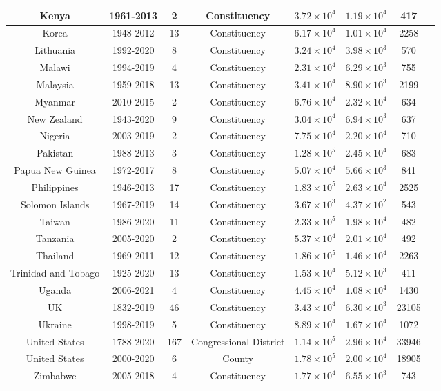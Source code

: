 \begin{table}[h]
\begin{tabular}{|c|c|c|c|c|c|c|c|}
Kenya & 1961-2013 & 2 & Constituency & $3.72\times 10^{4}$ & $1.19\times 10^{4}$ & 417\\ \hline
Korea & 1948-2012 & 13 & Constituency & $6.17\times 10^{4}$ & $1.01\times 10^{4}$ & 2258\\ \hline
Lithuania & 1992-2020 & 8 & Constituency & $3.24\times 10^{4}$ & $3.98\times 10^{3}$ & 570\\ \hline
Malawi & 1994-2019 & 4 & Constituency & $2.31\times 10^{4}$ & $6.29\times 10^{3}$ & 755\\ \hline
Malaysia & 1959-2018 & 13 & Constituency & $3.41\times 10^{4}$ & $8.90\times 10^{3}$ & 2199\\ \hline
Myanmar & 2010-2015 & 2 & Constituency & $6.76\times 10^{4}$ & $2.32\times 10^{4}$ & 634\\ \hline
New Zealand & 1943-2020 & 9 & Constituency & $3.04\times 10^{4}$ & $6.94\times 10^{3}$ & 637\\ \hline
Nigeria & 2003-2019 & 2 & Constituency & $7.75\times 10^{4}$ & $2.20\times 10^{4}$ & 710\\ \hline
Pakistan & 1988-2013 & 3 & Constituency & $1.28\times 10^{5}$ & $2.45\times 10^{4}$ & 683\\ \hline
Papua New Guinea & 1972-2017 & 8 & Constituency & $5.07\times 10^{4}$ & $5.66\times 10^{3}$ & 841\\ \hline
Philippines & 1946-2013 & 17 & Constituency & $1.83\times 10^{5}$ & $2.63\times 10^{4}$ & 2525\\ \hline
Solomon Islands & 1967-2019 & 14 & Constituency & $3.67\times 10^{3}$ & $4.37\times 10^{2}$ & 543\\ \hline
Taiwan & 1986-2020 & 11 & Constituency & $2.33\times 10^{5}$ & $1.98\times 10^{4}$ & 482\\ \hline
Tanzania & 2005-2020 & 2 & Constituency & $5.37\times 10^{4}$ & $2.01\times 10^{4}$ & 492\\ \hline
Thailand & 1969-2011 & 12 & Constituency & $1.86\times 10^{5}$ & $1.46\times 10^{4}$ & 2263\\ \hline
Trinidad and Tobago & 1925-2020 & 13 & Constituency & $1.53\times 10^{4}$ & $5.12\times 10^{3}$ & 411\\ \hline
Uganda & 2006-2021 & 4 & Constituency & $4.45\times 10^{4}$ & $1.08\times 10^{4}$ & 1430\\ \hline
UK & 1832-2019 & 46 & Constituency & $3.43\times 10^{4}$ & $6.30\times 10^{3}$ & 23105\\ \hline
Ukraine & 1998-2019 & 5 & Constituency & $8.89\times 10^{4}$ & $1.67\times 10^{4}$ & 1072\\ \hline
United States & 1788-2020 & 167 & Congressional District & $1.14\times 10^{5}$ & $2.96\times 10^{4}$ & 33946\\ \hline
United States & 2000-2020 & 6 & County & $1.78\times 10^{5}$ & $2.00\times 10^{4}$ & 18905\\ \hline
Zimbabwe & 2005-2018 & 4 & Constituency & $1.77\times 10^{4}$ & $6.55\times 10^{3}$ & 743\\ \hline
\end{tabular}
\end{table}

